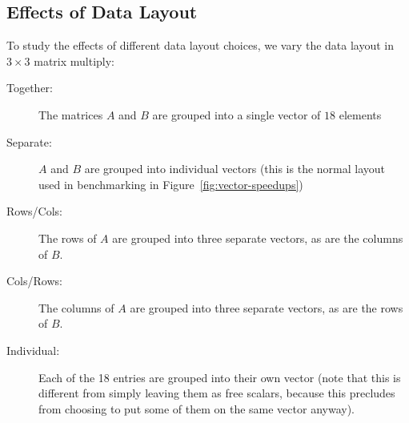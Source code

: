 \subsection{Effects of Data Layout}\label{sec:effects-of-data-layout}
To study the effects of different data layout choices, we vary the data layout in $3\times 3$ matrix multiply:
\begin{description}
    \item[Together:] The matrices $A$ and $B$ are grouped into a single vector of $18$ elements
    \item[Separate:] $A$ and $B$ are grouped into individual vectors (this is the normal layout used in benchmarking in Figure~\ref{fig:vector-speedups})
    \item[Rows/Cols:] The rows of $A$ are grouped into three separate vectors, as are the columns of $B$.
    \item[Cols/Rows:] The columns of $A$ are grouped into three separate vectors, as are the rows of $B$.
    \item[Individual:] Each of the 18 entries are grouped into their own vector (note that this is different from simply leaving them as free scalars, because this precludes \system from choosing to put some of them on the same vector anyway).     
\end{description}
